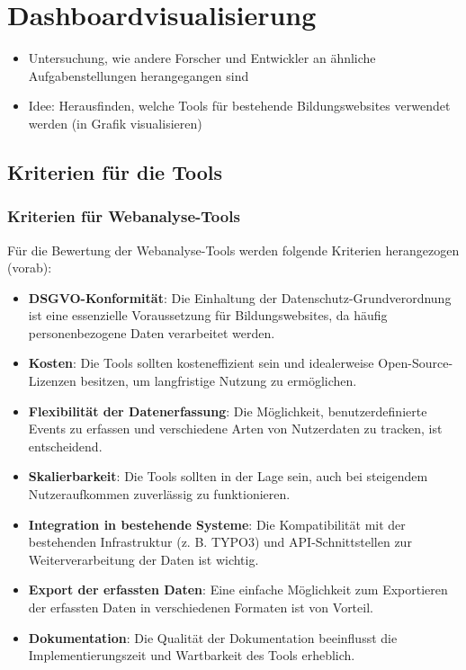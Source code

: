 \chapter{Dashboardvisualisierung} 
\label{ch:auswahl}

\begin{itemize}
    \item Untersuchung, wie andere Forscher und Entwickler an ähnliche Aufgabenstellungen herangegangen sind
    \item Idee: Herausfinden, welche Tools für bestehende Bildungswebsites verwendet werden (in Grafik visualisieren)
\end{itemize}

\section{Kriterien für die Tools}

\subsection{Kriterien für Webanalyse-Tools}
Für die Bewertung der Webanalyse-Tools werden folgende Kriterien herangezogen (vorab):
\begin{itemize}
    \item \textbf{DSGVO-Konformität}: Die Einhaltung der Datenschutz-Grundverordnung ist eine essenzielle Voraussetzung für Bildungswebsites, da häufig personenbezogene Daten verarbeitet werden.
    \item \textbf{Kosten}: Die Tools sollten kosteneffizient sein und idealerweise Open-Source-Lizenzen besitzen, um langfristige Nutzung zu ermöglichen.
    \item \textbf{Flexibilität der Datenerfassung}: Die Möglichkeit, benutzerdefinierte Events zu erfassen und verschiedene Arten von Nutzerdaten zu tracken, ist entscheidend.
    \item \textbf{Skalierbarkeit}: Die Tools sollten in der Lage sein, auch bei steigendem Nutzeraufkommen zuverlässig zu funktionieren.
    \item \textbf{Integration in bestehende Systeme}: Die Kompatibilität mit der bestehenden Infrastruktur (z. B. TYPO3) und API-Schnittstellen zur Weiterverarbeitung der Daten ist wichtig.
    \item \textbf{Export der erfassten Daten}: Eine einfache Möglichkeit zum Exportieren der erfassten Daten in verschiedenen Formaten ist von Vorteil.
    \item \textbf{Dokumentation}: Die Qualität der Dokumentation beeinflusst die Implementierungszeit und Wartbarkeit des Tools erheblich.
\end{itemize}

